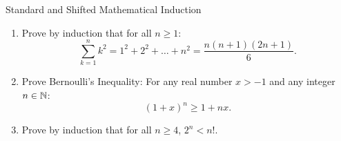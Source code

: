 \begin{exercise}{Standard and Shifted Mathematical Induction}
\begin{enumerate}[leftmargin=1.5em,itemsep=2pt]
  \item Prove by induction that for all $n \ge 1$:
  \[
  \sum_{k=1}^n k^2 = 1^2 + 2^2 + \dots + n^2 = \frac{n(n+1)(2n+1)}{6}.
  \]
  \item Prove Bernoulli's Inequality: For any real number $x > -1$ and any integer $n \in \mathbb{N}$:
  \[
  (1 + x)^n \ge 1 + nx.
  \]
  \item Prove by induction that for all $n \ge 4$, $2^n < n!$.
\end{enumerate}
\end{exercise}

\begin{tabletworkspace}[5.5cm]
\end{tabletworkspace}

